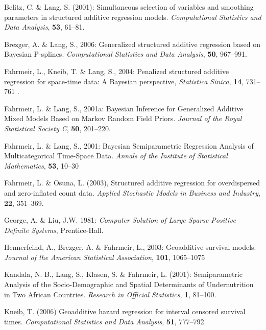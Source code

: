 \documentclass[11pt,a4paper,twoside]{bayesxreport}
\begin{document}
\begin{thebibliography}{99}

 Belitz, C. \& Lang, S.  (2001): Simultaneous selection of variables and smoothing
parameters in structured additive regression models. {\it Computational Statistics and Data Analysis}, {\bf 53}, 61--81.

 Brezger, A. \& Lang, S., 2006: Generalized structured additive regression based
on Bayesian P-splines. {\it Computational Statistics and Data Analysis}, {\bf 50}, 967--991.

 Fahrmeir, L., Kneib, T. \& Lang, S., 2004: Penalized structured additive
regression for space-time data: A Bayesian perspective, {\it Statistica Sinica}, {\bf 14}, 731--761 .

 Fahrmeir, L. \& Lang, S., 2001a: Bayesian Inference for Generalized Additive
Mixed Models Based on Markov Random Field Priors. {\it Journal of the Royal Statistical Society C}, {\bf 50}, 201--220.

 Fahrmeir, L. \& Lang, S., 2001: Bayesian Semiparametric Regression Analysis of
Multicategorical Time-Space Data. {\it Annals of the Institute of Statistical Mathematics}, {\bf 53}, 10--30

 Fahrmeir, L. \& Osuna, L. (2003), Structured additive regression for
overdispersed and zero-inflated count data. {\it Applied Stochastic Models in Business and Industry}, {\bf 22}, 351--369.

 George, A. \& Liu, J.W. 1981: {\it Computer Solution of Large Sparse Positive
Definite Systems}, Prentice-Hall.

 Hennerfeind, A., Brezger, A. \& Fahrmeir, L., 2003: Geoadditive
survival models. {\it Journal of the American Statistical Association}, {\bf 101}, 1065--1075

 Kandala, N. B., Lang, S., Klasen, S. \& Fahrmeir, L. (2001): Semiparametric
Analysis of the Socio-Demographic and Spatial Determinants of Undernutrition in Two African Countries. {\it Research in
Official Statistics}, {\bf 1}, 81--100.

  {Kneib, T.} (2006) Geoadditive hazard regression for interval censored
 survival times. {\it Computational Statistics and Data Analysis}, {\bf 51}, 777--792.


\end{thebibliography}
\end{document}

